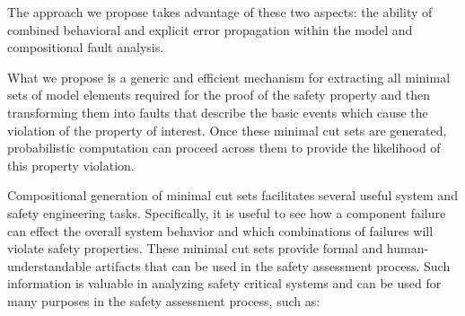 The approach we propose takes advantage of these two aspects: the ability of combined behavioral and explicit error propagation within the model and compositional fault analysis. 

What we propose is a generic and efficient mechanism for extracting all minimal sets of model elements required for the proof of the safety property and then transforming them into faults that describe the basic events which cause the violation of the property of interest. Once these minimal cut sets are generated, probabilistic computation can proceed across them to provide the likelihood of this property violation. 

Compositional generation of minimal cut sets facilitates several useful system and safety engineering tasks. Specifically, it is useful to see how a component failure can effect the overall system behavior and which combinations of failures will violate safety properties. These minimal cut sets provide formal and human-understandable artifacts that can be used in the safety assessment process. Such information is valuable in analyzing safety critical systems and can be used for many purposes in the safety assessment process, such as:

